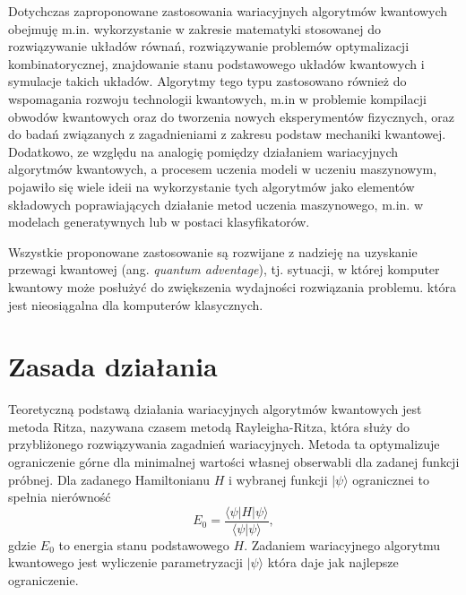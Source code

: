 \documentclass[a4paper,11pt]{article}
\newcommand{\ang}[1]{(ang. \emph{#1})}
\newcommand{\ket}[1]{| #1 \rangle}
\newcommand{\bra}[1]{\langle #1 |}
\newcommand{\braket}[2]{\bra{#2}{#1}\rangle}
\begin{document}
Dotychczas zaproponowane zastosowania wariacyjnych algorytmów kwantowych obejmuję m.in. wykorzystanie w zakresie matematyki stosowanej do rozwiązywanie układów równań, rozwiązywanie problemów optymalizacji kombinatorycznej, znajdowanie stanu podstawowego układów kwantowych i symulacje takich układów. Algorytmy tego typu zastosowano również do wspomagania rozwoju technologii kwantowych, m.in w problemie kompilacji obwodów kwantowych oraz do tworzenia nowych eksperymentów fizycznych, oraz do badań związanych z zagadnieniami z zakresu podstaw mechaniki kwantowej. Dodatkowo, ze względu na analogię pomiędzy działaniem wariacyjnych algorytmów kwantowych, a procesem uczenia modeli w uczeniu maszynowym, pojawiło się wiele ideii na wykorzystanie tych algorytmów jako elementów składowych poprawiających działanie metod uczenia maszynowego, m.in. w modelach generatywnych lub w postaci klasyfikatorów.

Wszystkie proponowane zastosowanie są rozwijane z nadzieję na uzyskanie przewagi kwantowej \ang{quantum adventage}, tj. sytuacji, w której komputer kwantowy może posłużyć do zwiększenia wydajności rozwiązania problemu. która jest nieosiągalna dla komputerów klasycznych.



\section{Zasada działania}\label{zasada-dzialania}

Teoretyczną podstawą działania wariacyjnych algorytmów kwantowych jest metoda Ritza, nazywana czasem metodą Rayleigha-Ritza, która służy do przybliżonego rozwiązywania zagadnień wariacyjnych. Metoda ta optymalizuje ograniczenie górne dla minimalnej wartości własnej obserwabli dla zadanej funkcji próbnej. Dla zadanego Hamiltonianu $H$ i wybranej funkcji $\ket{\psi}$ ogranicznei to spełnia nierówność
\begin{equation}
	E_0 = \frac{\bra{\psi} H \ket{\psi}}{\braket{\psi}{\psi}},
\end{equation}
gdzie $E_0$ to energia stanu podstawowego $H$. Zadaniem wariacyjnego algorytmu kwantowego jest wyliczenie parametryzacji  $\ket{\psi}$ która daje jak najlepsze ograniczenie.
\end{document}
